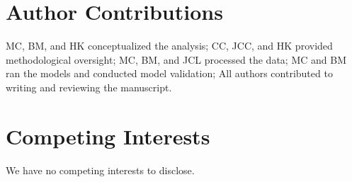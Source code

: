 \documentclass{article}
\begin{document}
\section{Author Contributions}
MC, BM, and HK conceptualized the analysis; CC, JCC, and HK provided methodological oversight; MC, BM, and JCL processed the data; MC and BM ran the models and conducted model validation; All authors contributed to writing and reviewing the manuscript.

\section{Competing Interests}
We have no competing interests to disclose.

\printbibliography
\end{document}
